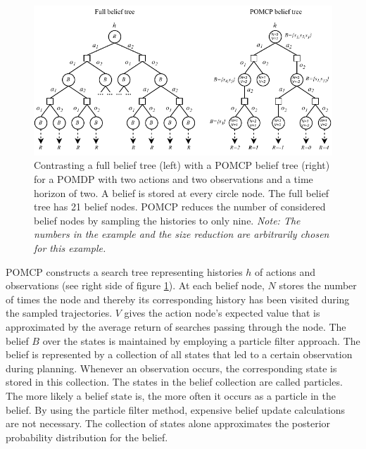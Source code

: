 \begin{figure}[htbp]
    \centerfloat
    \includegraphics[width=1.1\textwidth]{figures/pomcp_belief_tree.pdf}
    \caption[A full belief tree in contrast with a POMCP belief tree]{Contrasting a full belief tree (left) with a POMCP belief tree (right) for a POMDP with two actions and two observations and a time horizon of two. A belief is stored at every circle node. The full belief tree has 21 belief nodes. POMCP reduces the number of considered belief nodes by sampling the histories to only nine. \emph{Note: The numbers in the example and the size reduction are arbitrarily chosen for this example.}}
    \label{fig:full_vs_pomcp}
\end{figure}

\noindent
POMCP constructs a search tree representing histories $h$ of actions and observations (see right side of figure \ref{fig:full_vs_pomcp}). At each belief node, $N$ stores the number of times the node and thereby its corresponding history has been visited during the sampled trajectories. $V$ gives the action node's expected value that is approximated by the average return of searches passing through the node. The belief $B$ over the states is maintained by employing a particle filter approach. The belief is represented by a collection of all states that led to a certain observation during planning. Whenever an observation occurs, the corresponding state is stored in this collection. The states in the belief collection are called particles. The more likely a belief state is, the more often it occurs as a particle in the belief. By using the particle filter method, expensive belief update calculations are not necessary. The collection of states alone approximates the posterior probability distribution for the belief.

